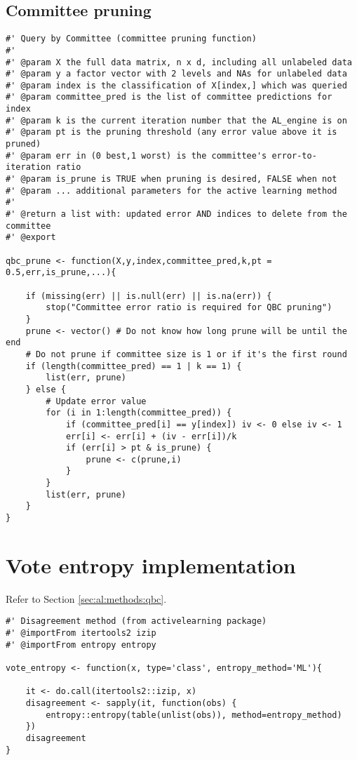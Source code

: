 \subsection{Committee pruning}
{
\begin{lstlisting}
#' Query by Committee (committee pruning function)
#'
#' @param X the full data matrix, n x d, including all unlabeled data
#' @param y a factor vector with 2 levels and NAs for unlabeled data
#' @param index is the classification of X[index,] which was queried
#' @param committee_pred is the list of committee predictions for index
#' @param k is the current iteration number that the AL_engine is on
#' @param pt is the pruning threshold (any error value above it is pruned)
#' @param err in (0 best,1 worst) is the committee's error-to-iteration ratio
#' @param is_prune is TRUE when pruning is desired, FALSE when not
#' @param ... additional parameters for the active learning method
#'
#' @return a list with: updated error AND indices to delete from the committee
#' @export

qbc_prune <- function(X,y,index,committee_pred,k,pt = 0.5,err,is_prune,...){

	if (missing(err) || is.null(err) || is.na(err)) {
		stop("Committee error ratio is required for QBC pruning")
	}
	prune <- vector() # Do not know how long prune will be until the end
	# Do not prune if committee size is 1 or if it's the first round
	if (length(committee_pred) == 1 | k == 1) {
		list(err, prune)
	} else {
		# Update error value
		for (i in 1:length(committee_pred)) {
			if (committee_pred[i] == y[index]) iv <- 0 else iv <- 1
			err[i] <- err[i] + (iv - err[i])/k
			if (err[i] > pt & is_prune) {
				prune <- c(prune,i)
			}
		}
		list(err, prune)
	}
}
\end{lstlisting}
}

\section{Vote entropy implementation}
\label{sec:appendicies:al:entropy}

Refer to Section \ref{sec:al:methods:qbc}.
{
\begin{lstlisting}
#' Disagreement method (from activelearning package)
#' @importFrom itertools2 izip
#' @importFrom entropy entropy

vote_entropy <- function(x, type='class', entropy_method='ML'){

	it <- do.call(itertools2::izip, x)
	disagreement <- sapply(it, function(obs) {
		entropy::entropy(table(unlist(obs)), method=entropy_method)
	})
	disagreement
}
\end{lstlisting}
}



